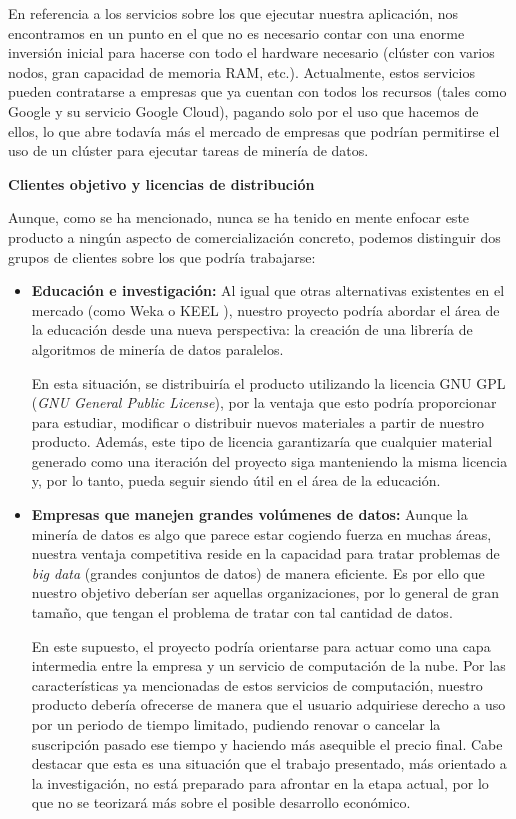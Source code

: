 En referencia a los servicios sobre los que ejecutar nuestra aplicación, nos encontramos en un punto en el que no es necesario contar con una enorme inversión inicial para hacerse con todo el hardware necesario (clúster con varios nodos, gran capacidad de memoria RAM, etc.). Actualmente, estos servicios pueden contratarse a empresas que ya cuentan con todos los recursos (tales como Google y su servicio Google Cloud), pagando solo por el uso que hacemos de ellos, lo que abre todavía más el mercado de empresas que podrían permitirse el uso de un clúster para ejecutar tareas de minería de datos.

\textbf{Clientes objetivo y licencias de distribución}

Aunque, como se ha mencionado, nunca se ha tenido en mente enfocar este producto a ningún aspecto de comercialización concreto, podemos distinguir dos grupos de clientes sobre los que podría trabajarse:

\begin{itemize}
\item \textbf{Educación e investigación:} Al igual que otras alternativas existentes en el mercado (como Weka \cite{WekaSoft} o KEEL \cite{KEELSoft1, KEELSoft2}), nuestro proyecto podría abordar el área de la educación desde una nueva perspectiva: la creación de una librería de algoritmos de minería de datos paralelos.

En esta situación, se distribuiría el producto utilizando la licencia GNU GPL (\textit{GNU General Public License}), por la ventaja que esto podría proporcionar para estudiar, modificar o distribuir nuevos materiales a partir de nuestro producto. Además, este tipo de licencia garantizaría que cualquier material generado como una iteración del proyecto siga manteniendo la misma licencia y, por lo tanto, pueda seguir siendo útil en el área de la educación.

\item \textbf{Empresas que manejen grandes volúmenes de datos:} Aunque la minería de datos es algo que parece estar cogiendo fuerza en muchas áreas, nuestra ventaja competitiva reside en la capacidad para tratar problemas de \textit{big data} (grandes conjuntos de datos) de manera eficiente. Es por ello que nuestro objetivo deberían ser aquellas organizaciones, por lo general de gran tamaño, que tengan el problema de tratar con tal cantidad de datos.

En este supuesto, el proyecto podría orientarse para actuar como una capa intermedia entre la empresa y un servicio de computación de la nube. Por las características ya mencionadas de estos servicios de computación, nuestro producto debería ofrecerse de manera que el usuario adquiriese derecho a uso por un periodo de tiempo limitado, pudiendo renovar o cancelar la suscripción pasado ese tiempo y haciendo más asequible el precio final. Cabe destacar que esta es una situación que el trabajo presentado, más orientado a la investigación, no está preparado para afrontar en la etapa actual, por lo que no se teorizará más sobre el posible desarrollo económico.

\end{itemize}

